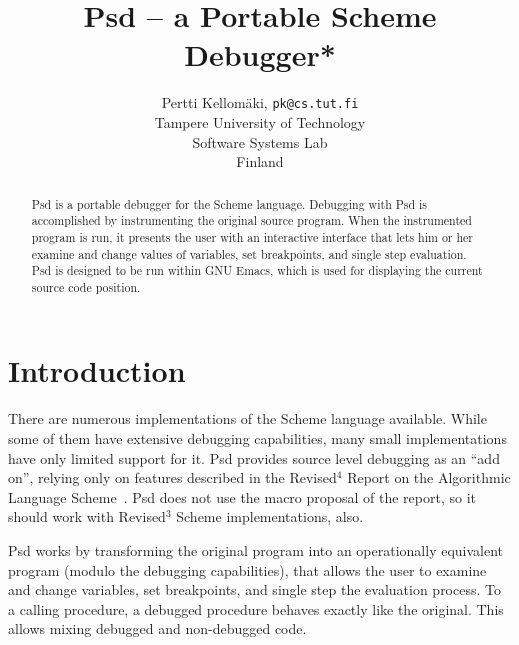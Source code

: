 %
%
%
%
%
%

\makeatletter
\long{}
\makeatother

\epsfverbosetrue

\newcommand{\scheme}[1]{{\tt #1}}
\newcommand{\foot}[2]{#1\footnotetext{\hbox to 1em{#1\hss}#2}}
\author{Pertti Kellom\"aki, {\tt pk@cs.tut.fi}\\ 
Tampere University of Technology \\
Software Systems Lab \\
Finland}
\title{Psd -- a Portable Scheme Debugger\foot{*}{To appear in Lisp Pointers}}
\maketitle
\pagestyle{empty}
\thispagestyle{empty}

\begin{abstract}
Psd is a portable debugger for the Scheme language. Debugging with Psd
is accomplished by instrumenting the original source program. When the
instrumented program is run, it presents the user with an interactive
interface that lets him or her examine and change values of variables,
set breakpoints, and single step evaluation. Psd is designed to be run
within GNU Emacs, which is used for displaying the current source code
position.
\end{abstract}

\section{Introduction}

There are numerous implementations of the Scheme language available.
While some of them have extensive debugging capabilities, many small
implementations have only limited support for it. Psd provides source
level debugging as an ``add on'', relying only on features described
in the Revised${}^4$ Report on the Algorithmic Language
Scheme~\cite{r4rs}. Psd does not use the macro proposal of the report,
so it should work with Revised${}^3$ Scheme implementations, also.

Psd works by transforming the original program into an operationally
equivalent program (modulo the debugging capabilities), that allows the
user to examine and change variables, set breakpoints, and single step
the evaluation process. To a calling procedure, a debugged procedure
behaves exactly like the original. This allows mixing debugged and
non-debugged code.

